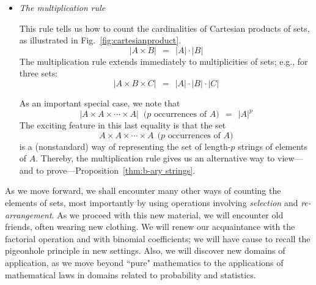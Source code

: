 \begin{itemize}
\begin{figure}[htb]
\begin{center}
        \caption{The union of sets $A$, $B$, and $C$ (left), and their intersections (right)}
        \label{fig:unionSets}
\end{center}
\end{figure}
In order to draw explicit expressions that express the content of  Fig.~\ref{fig:unionSets}, one must apply the law of {\em inclusion and exclusion} in multiple ways, as we compensate for the 
pairwise and triple intersections among  sets $A$, $B$, and $C$.  A careful reckoning using the figure indicates that
\[ |A \cup B \cup C| \ \ = \ \ 
\big(|A| + |B| + |C| \big) - \big( |A \cap B| + |A \cap C| + |B \cap C| \big) + |A \cap B \cap C|. \]
In particular, we begin by {\em including} the union; then we {\em exclude} the pairwise intersections, which were double-counted; and we finally {\em include} the triple intersection, which was first counted three times and then excluded three times while
removing the pairwise intersections.

\medskip\item
{\em The multiplication rule} 

\smallskip

This rule tells us how to count the cardinalities of Cartesian products of sets, as illustrated in Fig.~\ref{fig:cartesianproduct}.
\[ |A \times B| \ \ = \ \ |A| \cdot |B| \]
The multiplication rule extends immediately to multiplicities of sets; e.g., for three sets:
\[  |A \times B \times C| \ \ = \ \ |A| \cdot |B| \cdot |C| \]

\smallskip

As an important special case, we note that
\[ |A \times A \times \cdots  \times A| \ \mbox{ ($p$ occurrences of $A$)}  \ \ = \ \ |A|^p \]
The exciting feature in this last equality is that the set
 \[ A \times A \times \cdots  \times A  ~~\mbox{($p$ occurrences of $A$)} \]
is a (nonstandard) way of representing the set of length-$p$ strings of elements of $A$.  Thereby, the multiplication rule gives us an alternative way to  view---and to prove---Proposition~\ref{thm:b-ary strings}.
\end{itemize}

\bigskip

As we move forward, we shall encounter many other ways of counting the elements of sets,
most importantly by using operations involving {\it selection} and {\it re-arrangement}.  As we
proceed with this new material, we will encounter old friends, often wearing new clothing.  We
will renew our acquaintance with the factorial operation and with binomial coefficients; we will
have cause to recall the pigeonhole principle in new settings.  Also, we will discover new domains of application, as we move beyond ``pure" mathematics to the applications of mathematical laws in domains related to probability and statistics.

